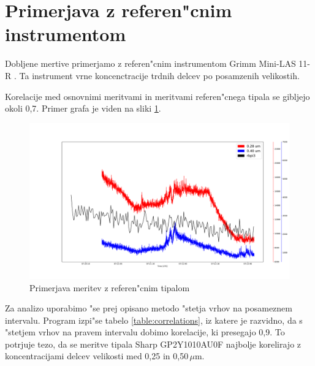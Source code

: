\documentclass[11pt,a4paper]{article}
\begin{document}
\clearpage
\section{Primerjava z referen"cnim instrumentom}
Dobljene mertive primerjamo z referen"cnim instrumentom Grimm Mini-LAS 11-R \cite{grimm-min-las}. Ta instrument vrne koncenctracije trdnih delcev po posamzenih velikostih.

Korelacije med osnovnimi meritvami in meritvami referen"cnega tipala se gibljejo okoli 0,7. Primer grafa je viden na sliki \ref{comparison}.

\begin{figure}[H]
	\begin{center}
		\includegraphics[width=16cm]{comparison.pdf}
		\caption{Primerjava meritev z referen"cnim tipalom}
		\label{comparison}
	\end{center}
\end{figure}

Za analizo uporabimo "se prej opisano metodo "stetja vrhov na posameznem intervalu. Program izpi"se tabelo \ref{table:correlations}, iz katere je razvidno, da s "stetjem vrhov na pravem intervalu dobimo korelacije, ki presegajo 0,9. To potrjuje tezo, da se meritve tipala Sharp GP2Y1010AU0F najbolje korelirajo z koncentracijami delcev velikosti med 0,25 in 0,50\,$\mu$m. 
\end{document}
